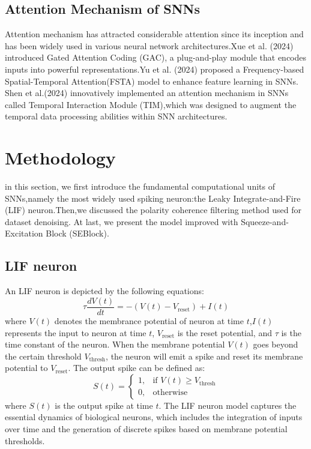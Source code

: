\documentclass[conference]{IEEEtran}
\begin{document}
\subsection{Attention Mechanism of SNNs}
Attention mechanism has attracted considerable attention since its inception and has been widely used in various neural network architectures.Xue et al. (2024) introduced Gated Attention Coding (GAC)\cite{qiu2024}, a plug-and-play module that encodes inputs into powerful representations.Yu et al. (2024) proposed a Frequency-based Spatial-Temporal Attention(FSTA) model to enhance feature learning in SNNs\cite{yu2025}. Shen et al.(2024) innovatively implemented an attention mechanism in SNNs called Temporal Interaction Module (TIM),which was designed to augment the temporal data processing abilities within SNN architectures\cite{shen2024}.


\section{Methodology}
in this section, we first introduce the fundamental computational units of SNNs,namely the most widely used spiking neuron:the Leaky Integrate-and-Fire (LIF) neuron\cite{10.5555/2728336.2728412}.Then,we discussed the polarity coherence filtering method used for dataset denoising. At last, we present the model improved with Squeeze-and-Excitation Block (SEBlock)\cite{hu2019}.
\subsection{LIF neuron}
An LIF neuron is depicted by the following equations:
\begin{equation}
\tau \frac{dV(t)}{dt} = -\left(V(t) - V_{\text{reset}}\right) + I(t)
\end{equation}
where $V(t)$ denotes the membrance potential of neuron at time $t$,$I(t)$ represents the input to neuron at time $t$, $V_{\text{reset}}$ is the reset potential, and $\tau$ is the time constant of the neuron. When the membrane potential $V(t)$ goes beyond the certain threshold $V_{\text{thresh}}$, the neuron will emit a spike and reset its membrane potential to $V_{\text{reset}}$. The output spike can be defined as:
\begin{equation}
S(t) = \begin{cases}
1, & \text{if } V(t) \geq V_{\text{thresh}} \\
0, & \text{otherwise}
\end{cases}
\end{equation}
where $S(t)$ is the output spike at time $t$. The LIF neuron model captures the essential dynamics of biological neurons, which includes the integration of inputs over time and the generation of discrete spikes based on membrane potential thresholds.
\end{document}
